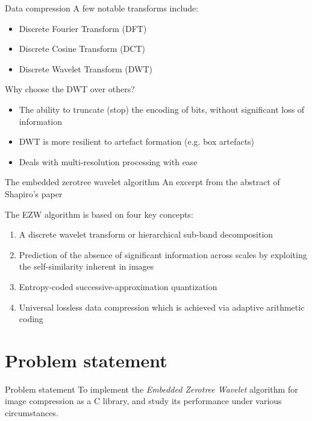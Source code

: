 \documentclass{beamer}
\begin{document}
\begin{frame}{Data compression}
    A few notable transforms include:
    \begin{itemize}
        \item Discrete Fourier Transform (DFT)
        \item Discrete Cosine Transform (DCT)
        \item Discrete Wavelet Transform (DWT)
    \end{itemize}
\end{frame}

\begin{frame}{Why choose the DWT over others?}
    \begin{itemize}
        \item The ability to truncate (stop) the encoding of bits, without
            significant loss of information
        \item DWT is more resilient to artefact formation (e.g. box artefacts)
        \item Deals with multi-resolution processing with ease
    \end{itemize}
\end{frame}

\begin{frame}{The embedded zerotree wavelet algorithm}
    An excerpt from the abstract of Shapiro's paper \cite{shap93}
    \vspace{0.5cm}

    \begin{displayquote}
        The EZW algorithm is based on four key concepts:
        \begin{enumerate}
            \item A discrete wavelet transform or hierarchical sub-band decomposition
            \item Prediction of the absence of significant information across scales by exploiting the self-similarity inherent in images
            \item Entropy-coded successive-approximation quantization
            \item Universal lossless data compression which is achieved via adaptive arithmetic coding
        \end{enumerate}
    \end{displayquote}
\end{frame}

\section{Problem statement}
\begin{frame}{Problem statement}
    To implement the \textit{Embedded Zerotree Wavelet} algorithm for image
    compression as a C library, and study its performance under various
    circumstances.
\end{frame}
\end{document}
